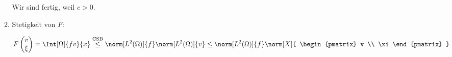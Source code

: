 \begin{solution}
\begin{enumerate}[label = \textbf{\alph*)}]
\begin{enumerate}[label = \arabic*.]
    Wir sind fertig, weil $c > 0$.

    \item Stetigkeit von $F$:
    
    \begin{align*}
      F
    \begin{pmatrix}
      v \\ \xi
    \end{pmatrix}
    =
    \Int[\Omega]{f v}{x}
    \stackrel
    {
      \mathrm{CSB}
    }{\leq}
    \norm[L^2(\Omega)]{f}
    \norm[L^2(\Omega)]{v}
    \leq
    \norm[L^2(\Omega)]{f}
    \norm[X]
    {
      \begin{pmatrix}
        v \\ \xi
      \end{pmatrix}  
    }
    \end{align*}

  \end{enumerate}

\end{enumerate}

\end{solution}

